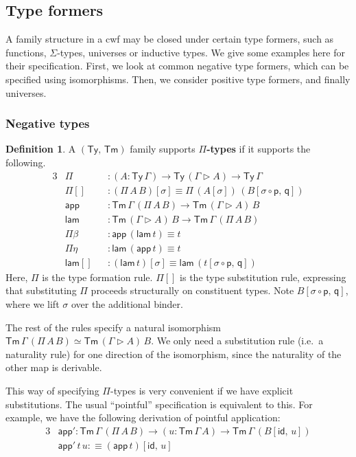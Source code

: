 \documentclass[12pt,a4paper,twoside,openany]{book}
\theoremstyle{remark}
\theoremstyle{definition}
\newtheorem{mydefinition}{Definition}
\theoremstyle{theorem}
\newcommand{\ms}[1]{\mathsf{#1}}
\newcommand{\id}{\mathsf{id}}
\newcommand{\Tm}{\mathsf{Tm}}
\newcommand{\Ty}{\mathsf{Ty}}
\newcommand{\ext}{\triangleright}
\newcommand{\p}{\mathsf{p}}
\newcommand{\q}{\mathsf{q}}
\newcommand{\app}{\ms{app}}
\newcommand{\lam}{\ms{lam}}
\newcommand{\defn}{:\equiv}
\begin{document}
\subsection{Type formers}
A family structure in a cwf may be closed under certain type formers, such as
functions, $\Sigma$-types, universes or inductive types. We give some examples
here for their specification. First, we look at common negative type formers,
which can be specified using isomorphisms. Then, we consider positive type
formers, and finally universes.

\subsubsection{Negative types}

\begin{mydefinition}
A $(\Ty,\,\Tm)$ family supports \textbf{$\Pi$-types} if it supports the following.
\begin{alignat*}{3}
  &\Pi           &&: (A : \Ty\,\Gamma) \to \Ty\,(\Gamma\ext A) \to \Ty\,\Gamma\\
  &\ms{\Pi[]}    &&: (\Pi\,A\,B)[\sigma] \equiv \Pi\,(A[\sigma])\,(B[\sigma\circ\p,\,\q])\\
  &\app          &&: \Tm\,\Gamma\,(\Pi\,A\,B) \to \Tm\,(\Gamma \ext A)\,B\\
  &\lam          &&: \Tm\,(\Gamma \ext A)\,B \to \Tm\,\Gamma\,(\Pi\,A\,B)\\
  &\Pi\beta      &&: \app\,(\lam\,t) \equiv t\\
  &\Pi\eta       &&: \lam\,(\app\,t) \equiv t\\
  &\lam[]        &&: (\lam\,t)[\sigma] \equiv \lam\,(t[\sigma\circ\p,\,\q])
\end{alignat*}
Here, $\Pi$ is the type formation rule. $\ms{\Pi[]}$ is the type substitution
rule, expressing that substituting $\Pi$ proceeds structurally on constituent
types.  Note $B[\sigma\circ\p,\,\q]$, where we lift $\sigma$ over the additional
binder.

The rest of the rules specify a natural isomorphism $\Tm\,\Gamma\,(\Pi\,A\,B)
\simeq \Tm\,(\Gamma \ext A)\,B$. We only need a substitution rule (i.e.\ a
naturality rule) for one direction of the isomorphism, since the naturality of
the other map is derivable.

This way of specifying $\Pi$-types is very convenient if we have explicit
substitutions. The usual ``pointful'' specification is equivalent to this. For
example, we have the following derivation of pointful application:
\begin{alignat*}{3}
  &\app' : \Tm\,\Gamma\,(\Pi\,A\,B) \to (u : \Tm\,\Gamma\,A) \to \Tm\,\Gamma\,(B[\id,\,u])\\
  &\app'\,t\,u \defn (\app\,t)[\id,\,u]
\end{alignat*}

\end{mydefinition}
\end{document}
